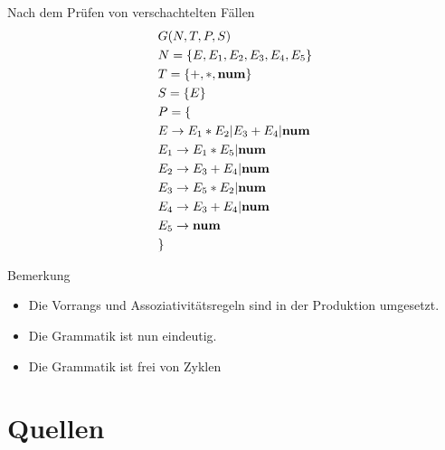 \documentclass[t]{beamer}
\begin{document}
    \begin{frame}
        \centering
        \begin{minipage}[c]{0.45\textwidth}
            \vspace{-1em}
            \centering
            \begin{block}{Nach dem Prüfen von verschachtelten Fällen}
                \vspace{-2em}
                \begin{align*}
                    & G(N,T,P,S) \\
                    & N= \{E, E_1, E_2, E_3, E_4, E_5\} \\
                    & T= \{+, *, \bold{num}\} \\
                    & S= \{E\} \\
                    & P = \{ \\
                    & E     \rightarrow E_1 * E_2 | E_3 + E_4 | \bold{num} \\
                    & E_1   \rightarrow E_1 * E_5 | \bold{num} \\
                    & E_2   \rightarrow E_3 + E_4 | \bold{num} \\
                    & E_3   \rightarrow E_5 * E_2 | \bold{num} \\
                    & E_4   \rightarrow E_3 + E_4 | \bold{num} \\
                    & E_5   \rightarrow \bold{num} \\
                    & \}
                \end{align*}
            \end{block}
        \end{minipage}%
        \quad\quad%
        \begin{minipage}[c]{0.45\textwidth}
            \vspace{-1em}
            \centering
            \begin{exampleblock}{Bemerkung}
                \begin{itemize}
                    \item Die Vorrangs und Assoziativitätsregeln sind in der Produktion umgesetzt.
                    \item Die Grammatik ist nun eindeutig.
                    \item Die Grammatik ist frei von Zyklen
                \end{itemize}
            \end{exampleblock}
        \end{minipage}
    \end{frame}


    \section{Quellen}\label{sec:quellen}
    \begin{frame}[allowframebreaks]
        
        
    \end{frame}
\end{document}
